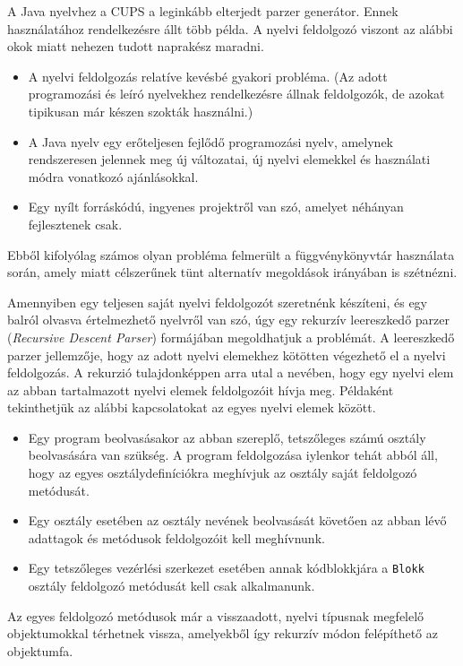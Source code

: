 A Java nyelvhez a CUPS a leginkább elterjedt parzer generátor. Ennek használatához rendelkezésre állt több példa. A nyelvi feldolgozó viszont az alábbi okok miatt nehezen tudott naprakész maradni.
\begin{itemize}
\item A nyelvi feldolgozás relatíve kevésbé gyakori probléma. (Az adott programozási és leíró nyelvekhez rendelkezésre állnak feldolgozók, de azokat tipikusan már készen szokták használni.)
\item A Java nyelv egy erőteljesen fejlődő programozási nyelv, amelynek rendszeresen jelennek meg új változatai, új nyelvi elemekkel és használati módra vonatkozó ajánlásokkal.
\item Egy nyílt forráskódú, ingyenes projektről van szó, amelyet néhányan fejlesztenek csak.
\end{itemize}
Ebből kifolyólag számos olyan probléma felmerült a függvénykönyvtár használata során, amely miatt célszerűnek tünt alternatív megoldások irányában is szétnézni.


Amennyiben egy teljesen saját nyelvi feldolgozót szeretnénk készíteni, és egy balról olvasva értelmezhető nyelvről van szó, úgy egy rekurzív leereszkedő parzer (\textit{Recursive Descent Parser}) formájában megoldhatjuk a problémát. A leereszkedő parzer jellemzője, hogy az adott nyelvi elemekhez kötötten végezhető el a nyelvi feldolgozás. A rekurzió tulajdonképpen arra utal a nevében, hogy egy nyelvi elem az abban tartalmazott nyelvi elemek feldolgozóit hívja meg. Példaként tekinthetjük az alábbi kapcsolatokat az egyes nyelvi elemek között.
\begin{itemize}
\item Egy program beolvasásakor az abban szereplő, tetszőleges számú osztály beolvasására van szükség. A program feldolgozása iylenkor tehát abból áll, hogy az egyes osztálydefiníciókra meghívjuk az osztály saját feldolgozó metódusát.
\item Egy osztály esetében az osztály nevének beolvasását követően az abban lévő adattagok és metódusok feldolgozóit kell meghívnunk.
\item Egy tetszőleges vezérlési szerkezet esetében annak kódblokkjára a \texttt{Blokk} osztály feldolgozó metódusát kell csak alkalmanunk.
\end{itemize}
Az egyes feldolgozó metódusok már a visszaadott, nyelvi típusnak megfelelő objektumokkal térhetnek vissza, amelyekből így rekurzív módon felépíthető az objektumfa.

